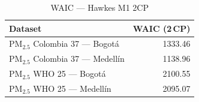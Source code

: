 \begin{table}[htbp]
\centering
\caption{WAIC --- Hawkes M1 2CP}
\label{tab:hawkes_waic_2cp}
\begin{tabular}{lr}
\toprule
Dataset & WAIC (2\,CP) \\
\midrule
PM$_{2.5}$ Colombia 37 --- Bogot\'{a} & 1333.46 \\
PM$_{2.5}$ Colombia 37 --- Medell\'{i}n & 1138.96 \\
PM$_{2.5}$ WHO 25 --- Bogot\'{a} & 2100.55 \\
PM$_{2.5}$ WHO 25 --- Medell\'{i}n & 2095.07 \\
\bottomrule
\end{tabular}
\end{table}
